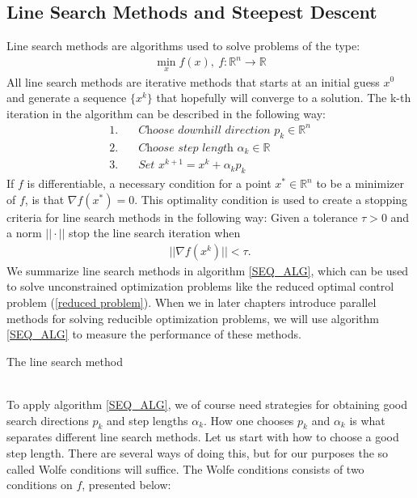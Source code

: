 \subsection{Line Search Methods and Steepest Descent}
Line search methods are algorithms used to solve problems of the type: 
\begin{align*}
\min_x f(x), \ f:\mathbb{R}^n\longrightarrow\mathbb{R}
\end{align*}
All line search methods are iterative methods that starts at an initial guess $x^0$ and generate a sequence $\{x^k\}$ that hopefully will converge to a solution. The k-th iteration in the algorithm can be described in the following way:
\begin{align*}
1.\quad&\textit{Choose downhill direction $p_k\in\mathbb{R}^n$} \\
2.\quad&\textit{Choose step length $\alpha_k\in\mathbb{R}$} \\
3.\quad&\textit{Set $x^{k+1}=x^k + \alpha_kp_k$} 
\end{align*}
If $f$ is differentiable, a necessary condition for a point $x^*\in\mathbb{R}^n$ to be a minimizer of $f$, is that $\nabla f(x^*)=0$. This optimality condition is used to create a stopping criteria for line search methods in the following way: Given a tolerance $\tau>0$ and a norm $||\cdot||$ stop the line search iteration when
\begin{align}
||\nabla f(x^k)||<\tau. \label{opti_con}
\end{align}
We summarize line search methods in algorithm \ref{SEQ_ALG}, which can be used to solve unconstrained optimization problems like the reduced optimal control problem (\ref{reduced problem}). When we in later chapters introduce parallel methods for solving reducible optimization problems, we will use algorithm \ref{SEQ_ALG} to measure the performance of these methods. 
\\
\begin{algorithm}[H] 
\caption{The line search method\label{SEQ_ALG}}
\end{algorithm}
\noindent
\\ 
To apply algorithm \ref{SEQ_ALG}, we of course need strategies for obtaining good search directions $p_k$ and step lengths $\alpha_k$. How one chooses $p_k$ and $\alpha_k$ is what separates different line search methods. Let us start with how to choose a good step length. There are several ways of doing this, but for our purposes the so called Wolfe conditions will suffice. The Wolfe conditions consists of two conditions on $f$, presented below:
